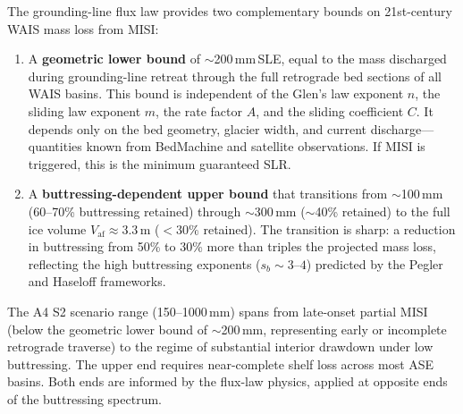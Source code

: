 \documentclass[11pt]{article}
\newcommand{\Vaf}{V_{\mathrm{af}}}
\begin{document}
The grounding-line flux law provides two complementary bounds on 21st-century WAIS mass loss from MISI:

\begin{enumerate}
	\item A \textbf{geometric lower bound} of $\sim$200\,mm\,SLE, equal to the mass discharged during grounding-line retreat through the full retrograde bed sections of all WAIS basins. This bound is independent of the Glen's law exponent $n$, the sliding law exponent $m$, the rate factor $A$, and the sliding coefficient $C$. It depends only on the bed geometry, glacier width, and current discharge---quantities known from BedMachine and satellite observations. If MISI is triggered, this is the minimum guaranteed SLR.

	\item A \textbf{buttressing-dependent upper bound} that transitions from $\sim$100\,mm (60--70\% buttressing retained) through $\sim$300\,mm ($\sim$40\% retained) to the full ice volume $\Vaf \approx 3.3$\,m ($< 30\%$ retained). The transition is sharp: a reduction in buttressing from 50\% to 30\% more than triples the projected mass loss, reflecting the high buttressing exponents ($s_b \sim 3$--$4$) predicted by the Pegler and Haseloff frameworks.
\end{enumerate}

The A4 S2 scenario range (150--1000\,mm) spans from late-onset partial MISI (below the geometric lower bound of $\sim$200\,mm, representing early or incomplete retrograde traverse) to the regime of substantial interior drawdown under low buttressing. The upper end requires near-complete shelf loss across most ASE basins. Both ends are informed by the flux-law physics, applied at opposite ends of the buttressing spectrum.



\end{document}
